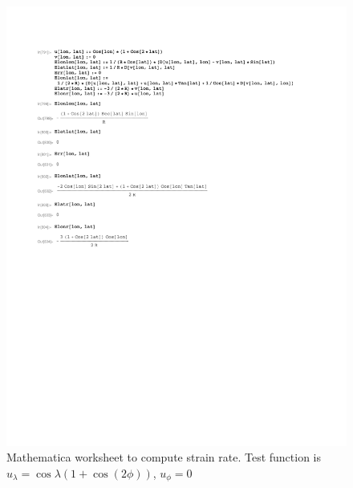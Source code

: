 \documentclass[11pt]{report}
\begin{document}
\begin{figure}[htbp]
 \center
 \includegraphics[scale=0.8, trim = 0 4in 0 0, clip]{f/130520_u_coscos.pdf}
 \caption{Mathematica worksheet to compute strain rate.  Test function is $u_{\lambda}=\cos \lambda (1+\cos(2\phi))$, $u_{\phi}=0$}
 \label{fig:mathematica1}
\end{figure}
\end{document}
